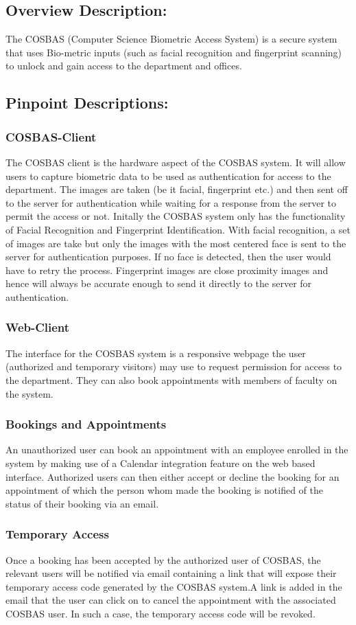 \subsection{Overview Description:}
	The COSBAS (Computer Science Biometric Access System) is a secure system that uses Bio-metric inputs (such as facial recognition and fingerprint scanning) to unlock and gain access to the department and offices.
	
\subsection{Pinpoint Descriptions:}
	\subsubsection{COSBAS-Client}
	The COSBAS client is the hardware aspect of the COSBAS system. It will allow users to capture biometric data to be used as authentication for access to the department. The images are taken (be it facial, fingerprint etc.) and then sent off to the server for authentication while waiting for a response from the server to permit the access or not. Initally the COSBAS system only has the functionality of Facial Recognition and Fingerprint Identification. With facial recognition, a set of images are take but only the images with the most centered face is sent to the server for authentication purposes. If no face is detected, then the user would have to retry the process. Fingerprint images are close proximity images and hence will always be accurate enough to send it directly to the server for authentication.
	
	\subsubsection{Web-Client}
	The interface for the COSBAS system is a responsive webpage the user (authorized and temporary visitors) may use to request permission for access to the department. They can also book appointments with members of faculty on the system.
	
	\subsubsection{Bookings and Appointments}
	An unauthorized user can book an appointment with an employee enrolled in the system by making use of a Calendar integration feature on the web based interface. Authorized users can then either accept or decline the booking for an appointment of which the person whom made the booking is notified of the status of their booking via an email.
	
	\subsubsection{Temporary Access}
	Once a booking has been accepted by the authorized user of COSBAS, the relevant users will be notified via email containing a link that will expose their temporary access code generated by the COSBAS system.A link is added in the email that the user can click on to cancel the appointment with the associated COSBAS user. In such a case, the temporary access code will be revoked.